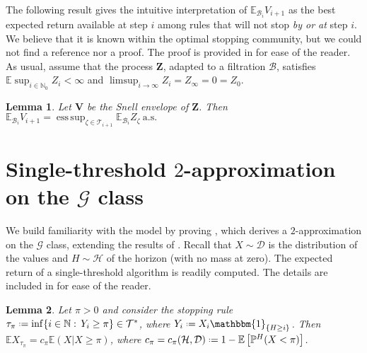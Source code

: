 \documentclass[11pt, a4paper, twoside]{article}
\newcommand*{\defeq}{\mathrel{\vcenter{\baselineskip0.5ex \lineskiplimit0pt
			\hbox{\scriptsize.}\hbox{\scriptsize.}}}=}
\newcommand{\NN}{\mathbb{N}}
\newcommand{\EE}{\mathbb{E}}
\newcommand{\PP}{\mathbb{P}}
\newcommand{\TT}{\mathcal{T}}
\newcommand{\HH}{\mathcal{H}}
\newcommand{\DD}{\mathcal{D}}
\newcommand{\PGF}{\mathcal{G}}
\newcommand{\VV}{\mathbf{V}}
\newcommand{\DZ}{\mathbf{Z}}
\newcommand{\DF}{\mathcal{B}}
\newcommand{\II}{\mathbbm{1}}
\newcommand{\as}{\:\text{a.s.}}
\DeclareMathOperator*{\esup}{ess\,sup} \DeclareMathOperator{\supp}{supp}
\newtheorem{lemma}{Lemma}[section]
\numberwithin{equation}{section}
\begin{document}
	The following result gives the intuitive interpretation of $\EE_{\DF_i}V_{i+1}$ as the best expected return available at step $i$ among rules that will not stop \textit{by or at} step $i$. We believe that it is known within the optimal stopping community, but we could not find a reference nor a proof. The proof is provided in  for ease of the reader. As usual, assume that the process $\DZ$, adapted to a filtration $\DF$, satisfies $\EE\sup_{i\in\NN_0}Z_i<\infty$ and $\limsup_{i\longrightarrow\infty}Z_i=Z_\infty=0=Z_0$.
	\begin{lemma}\label{snellfuture}
		Let $\VV$ be the Snell envelope of $\DZ$. Then
		$\EE_{\DF_i}V_{i+1}=\esup_{\zeta\in\TT_{i+1}}\EE_{\DF_i}Z_\zeta \as$
	\end{lemma}
	
	\section{Single-threshold $2$-approximation on the $\PGF$ class}\label{Gclass}
	We build familiarity with the model by proving , which derives a $2$-approximation on the $\PGF$ class, extending the results of \cite[Section~3]{AliBanGolMunWan20}. Recall that $X\sim\DD$ is the distribution of the values and $H\sim\HH$ of the horizon (with no mass at zero). The expected return of a single-threshold algorithm is readily computed. The details are included in  for ease of the reader.
	\begin{lemma}\label{algp}
		Let $\pi>0$ and consider the stopping rule $\tau_\pi\defeq\inf\{i\in\NN:\,Y_i\ge \pi\}\in\TT^*$, where $Y_i\defeq X_i\II_{\{H\ge i\}}$. Then $\EE X_{\tau_\pi}= c_\pi\EE(X|X\ge \pi)$, where $c_\pi=c_\pi(\HH,\DD)\defeq 1-\EE\left[\PP^H(X<\pi)\right]$.
	\end{lemma}
	
\end{document}
